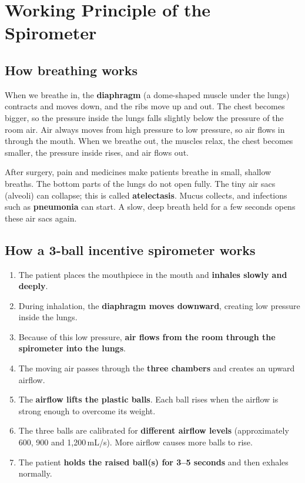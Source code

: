 \documentclass[12pt,a4paper]{article}
\begin{document}
\section{Working Principle of the Spirometer}
\label{sec:principle}

\subsection{How breathing works}
When we breathe in, the \textbf{diaphragm} (a dome-shaped muscle under the lungs) contracts and moves down, and the ribs move up and out. The chest becomes bigger, so the pressure inside the lungs falls slightly below the pressure of the room air. Air always moves from high pressure to low pressure, so air flows in through the mouth. When we breathe out, the muscles relax, the chest becomes smaller, the pressure inside rises, and air flows out.

After surgery, pain and medicines make patients breathe in small, shallow breaths. The bottom parts of the lungs do not open fully. The tiny air sacs (alveoli) can collapse; this is called \textbf{atelectasis}. Mucus collects, and infections such as \textbf{pneumonia} can start. A slow, deep breath held for a few seconds opens these air sacs again.

\subsection{How a 3-ball incentive spirometer works}
\begin{enumerate}
  \item The patient places the mouthpiece in the mouth and \textbf{inhales slowly and deeply}.
  \item During inhalation, the \textbf{diaphragm moves downward}, creating low pressure inside the lungs.
  \item Because of this low pressure, \textbf{air flows from the room through the spirometer into the lungs}.
  \item The moving air passes through the \textbf{three chambers} and creates an upward airflow.
  \item The \textbf{airflow lifts the plastic balls}. Each ball rises when the airflow is strong enough to overcome its weight.
  \item The three balls are calibrated for \textbf{different airflow levels} (approximately 600, 900 and 1,200\,mL/s). More airflow causes more balls to rise.
  \item The patient \textbf{holds the raised ball(s) for 3--5 seconds} and then exhales normally.
\end{enumerate}
\end{document}
